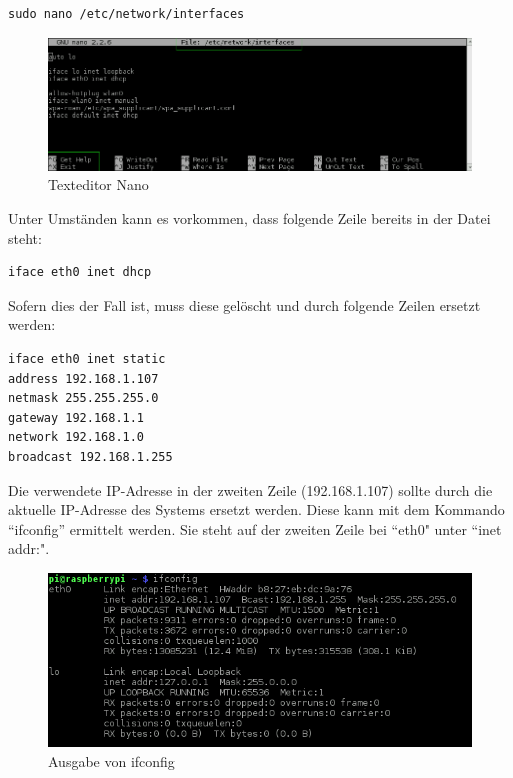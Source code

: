 \begin{lstlisting}
sudo nano /etc/network/interfaces
\end{lstlisting}

\begin{figure}[h]
\centering
\includegraphics[scale=0.6]{images/nano}
\caption{Texteditor Nano}
\end{figure}

Unter Umständen kann es vorkommen, dass folgende Zeile bereits in der Datei steht:

\begin{lstlisting}
iface eth0 inet dhcp
\end{lstlisting}

Sofern dies der Fall ist, muss diese gelöscht und durch folgende Zeilen ersetzt werden:

\begin{lstlisting}
iface eth0 inet static
address 192.168.1.107
netmask 255.255.255.0
gateway 192.168.1.1
network 192.168.1.0
broadcast 192.168.1.255
\end{lstlisting}

Die verwendete IP-Adresse in der zweiten Zeile (192.168.1.107) sollte durch die aktuelle IP-Adresse des Systems ersetzt werden. Diese kann mit dem Kommando ``ifconfig'' ermittelt werden. Sie steht auf der zweiten Zeile bei ``eth0" unter ``inet addr:".

\begin{figure}[h]
\centering
\includegraphics[scale=0.65]{images/ifconfig}
\caption{Ausgabe von ifconfig}
\end{figure}

